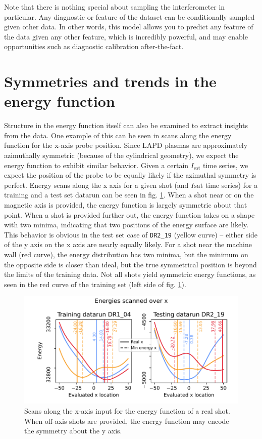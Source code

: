 Note that there is nothing special about sampling the interferometer in particular. Any diagnostic or feature of the dataset can be conditionally sampled given other data. In other words, this model allows you to predict any feature of the data given any other feature, which is incredibly powerful, and may enable opportunities such as diagnostic calibration after-the-fact.

\section{Symmetries and trends in the energy function}

Structure in the energy function itself can also be examined to extract insights from the data. One example of this can be seen in scans along the energy function for the x-axis probe position. Since LAPD plasmas are approximately azimuthally symmetric (because of the cylindrical geometry), we expect the energy function to exhibit similar behavior. Given a certain $I_\text{sat}$ time series, we expect the position of the probe to be equally likely if the azimuthal symmetry is perfect. Energy scans along the x axis for a given shot (and $I\text{sat}$ time series) for a training and a test set datarun can be seen in fig. \ref{fig:energy_x_scan}. When a shot near or on the magnetic axis is provided, the energy function is largely symmetric about that point. When a shot is provided further out, the energy function takes on a shape with two minima, indicating that two positions of the energy surface are likely. This behavior is obvious in the test set case of \texttt{DR2\_19} (yellow curve) -- either side of the y axis on the x axis are nearly equally likely. For a shot near the machine wall (red curve), the energy distribution has two minima, but the minimum on the opposite side is closer than ideal, but the true symmetrical position is beyond the limits of the training data. Not all shots yield symmetric energy functions, as seen in the red curve of the training set (left side of fig. \ref{fig:energy_x_scan}). 

\begin{figure}
	\centering
	\includegraphics[width=400pt]{figures/energy_x_scan_train-test_39-0}
	\caption{\label{fig:energy_x_scan}Scans along the x-axis input for the energy function of a real shot. When off-axis shots are provided, the energy function may encode the symmetry about the y axis.}
\end{figure}


